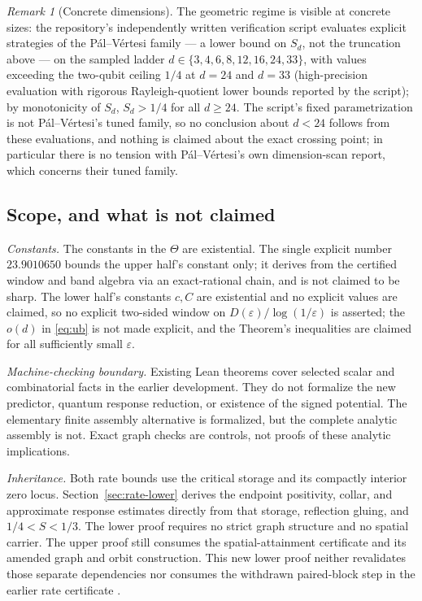 \documentclass[11pt]{article}
\theoremstyle{remark}
\newtheorem{remark}[theorem]{Remark}
\newcommand{\eps}{\varepsilon}
\begin{document}
\begin{remark}[Concrete dimensions]
The geometric regime is visible at concrete sizes: the repository's
independently written verification script evaluates explicit strategies
of the P\'al--V\'ertesi family --- a lower bound on $S_d$, not the
truncation above --- on the sampled ladder
$d\in\{3,4,6,8,12,16,24,33\}$, with values exceeding the two-qubit
ceiling $1/4$ at $d=24$ and $d=33$ (high-precision evaluation with
rigorous Rayleigh-quotient lower bounds reported by the script); by
monotonicity of $S_d$, $S_d>1/4$ for all $d\ge24$. The script's fixed
parametrization is not P\'al--V\'ertesi's tuned family, so no conclusion
about $d<24$ follows from these evaluations, and nothing is claimed about
the exact crossing point; in particular there is no tension with
P\'al--V\'ertesi's own dimension-scan report, which concerns their tuned
family.
\end{remark}

\subsection{Scope, and what is not claimed}\label{sec:rate-scope}

\emph{Constants.} The constants in the $\Theta$ are existential. The
single explicit number $23.9010650$ bounds the upper half's constant
only; it derives from the certified window and band algebra via
an exact-rational chain, and is not claimed to be sharp.
The lower half's constants $c,C$ are
existential and no explicit values are claimed, so no explicit two-sided
window on $D(\eps)/\log(1/\eps)$ is asserted; the $o(d)$ in
\eqref{eq:ub} is not made explicit, and the Theorem's inequalities are
claimed for all sufficiently small $\eps$.

\emph{Machine-checking boundary.} Existing Lean theorems cover selected
scalar and combinatorial facts in the earlier development. They do not
formalize the new predictor, quantum response reduction, or existence of
the signed potential. The elementary finite assembly alternative is
formalized, but the complete analytic assembly is not.
Exact graph checks are controls, not proofs of these
analytic implications.

\emph{Inheritance.} Both rate bounds use the critical storage and its
compactly interior zero locus. Section~\ref{sec:rate-lower} derives the
endpoint positivity, collar, and approximate response estimates directly
from that storage, reflection gluing, and $1/4<S<1/3$. The lower proof
requires no strict graph structure and no spatial carrier. The upper
proof still consumes the spatial-attainment certificate and its amended
graph and orbit construction. This new lower proof neither revalidates
those separate dependencies nor consumes the withdrawn paired-block
step in the earlier rate certificate \cite{RLB26}.
\end{document}
